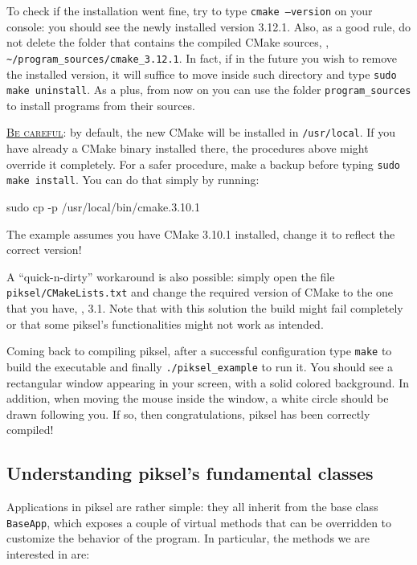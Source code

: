 \documentclass{article}
\begin{document}
To check if the installation went fine, try to type \texttt{cmake --version} on your console: you should see the newly installed version 3.12.1. Also, as a good rule, do not delete the folder that contains the compiled CMake sources, \eg, \texttt{\textasciitilde/program\string_sources/cmake\string_3.12.1}. In fact, if in the future you wish to remove the installed version, it will suffice to move inside such directory and type \texttt{sudo make uninstall}. As a plus, from now on you can use the folder \texttt{program\string_sources} to install programs from their sources.

\begin{mdframed}[hidealllines=true,backgroundcolor=red!20]
  \underline{\textsc{Be careful}}: by default, the new CMake will be installed in \texttt{/usr/local}. If you have already a CMake binary installed there, the procedures above might override it completely. For a safer procedure, make a backup before typing \texttt{sudo make install}. You can do that simply by running:
  \begin{center}
    \ttfamily
    sudo cp -p /usr/local/bin/cmake.3.10.1
  \end{center}
  The example assumes you have CMake 3.10.1 installed, change it to reflect the correct version!
\end{mdframed}

A ``quick-n-dirty'' workaround is also possible: simply open the file \texttt{piksel/CMakeLists.txt} and change the required version of CMake to the one that you have, \eg, 3.1. Note that with this solution the build might fail completely or that some piksel's functionalities might not work as intended.

Coming back to compiling piksel, after a successful configuration type \texttt{make} to build the executable and finally \texttt{./piksel\string_example} to run it. You should see a rectangular window appearing in your screen, with a solid colored background. In addition, when moving the mouse inside the window, a white circle should be drawn following you. If so, then congratulations, piksel has been correctly compiled!




\subsection{Understanding piksel's fundamental classes}

Applications in piksel are rather simple: they all inherit from the base class \texttt{BaseApp}, which exposes a couple of virtual methods that can be overridden to customize the behavior of the program. In particular, the methods we are interested in are:
\end{document}
